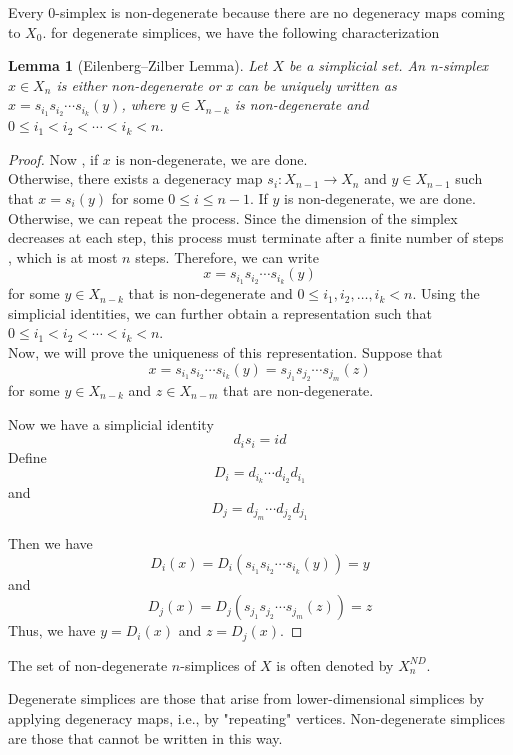 \documentclass[11pt]{article}
\theoremstyle{definition}
\theoremstyle{plain}
\newtheorem{lemma}[definition]{Lemma}
\begin{document}
Every 0-simplex is non-degenerate because there are no degeneracy maps coming to $X_0$.
for degenerate simplices, we have the following characterization
\begin{lemma}[Eilenberg–Zilber Lemma]
    Let $X$ be a simplicial set. An n-simplex $x \in X_n$ is either non-degenerate or   x can be   uniquely written as $x = s_{i_1} s_{i_2} \cdots s_{i_k}(y)$, where $y \in X_{n-k}$ is non-degenerate and $0 \leq i_1 < i_2 < \cdots < i_k < n$.
\end{lemma}
\begin{proof}
    Now , if $x$ is non-degenerate, we are done. \\
    Otherwise, there exists a degeneracy map $s_i : X_{n-1} \to X_n$ and $y \in X_{n-1}$ such that $x = s_i(y)$ for some $0 \leq i \leq n-1$. If $y$ is non-degenerate, we are done. Otherwise, we can repeat the process. Since the dimension of the simplex decreases at each step, this process must terminate after a finite number of steps , which is at most $n$ steps. Therefore, we can write
    \[
        x = s_{i_1} s_{i_2} \cdots s_{i_k}(y)
    \]
    for some $y \in X_{n-k}$ that is non-degenerate and $0 \leq i_1, i_2, \ldots, i_k < n$.
    Using the simplicial identities, we can further obtain a representation such that $0 \leq i_1 < i_2 < \cdots < i_k < n$.\\

    Now, we will prove the uniqueness of this representation. Suppose that
    \[
        x = s_{i_1} s_{i_2} \cdots s_{i_k}(y) = s_{j_1} s_{j_2} \cdots s_{j_m}(z)
    \]
    for some $y \in X_{n-k}$ and $z \in X_{n-m}$ that are non-degenerate.

    Now we have a simplicial identity
    \[
        d_i s_i= id
    \]
    Define \[
        D_i=d_{i_k} \cdots d_{i_2}  d_{i_1}
    \]
    and
    \[
        D_j=d_{j_m} \cdots d_{j_2}  d_{j_1}
    \]


    Then we have    \[
        D_i(x) = D_i(s_{i_1} s_{i_2} \cdots s_{i_k}(y)) = y
    \] and
    \[
        D_j(x) = D_j(s_{j_1} s_{j_2} \cdots s_{j_m}(z)) = z
    \]
    Thus, we have $y = D_i(x)$ and $z = D_j(x)$.
\end{proof}






The set of non-degenerate $n$-simplices of $X$ is often denoted by $X_n^{ND}$.

Degenerate simplices are those that arise from lower-dimensional simplices by applying degeneracy maps, i.e., by "repeating" vertices. Non-degenerate simplices are those that cannot be written in this way.
\end{document}
